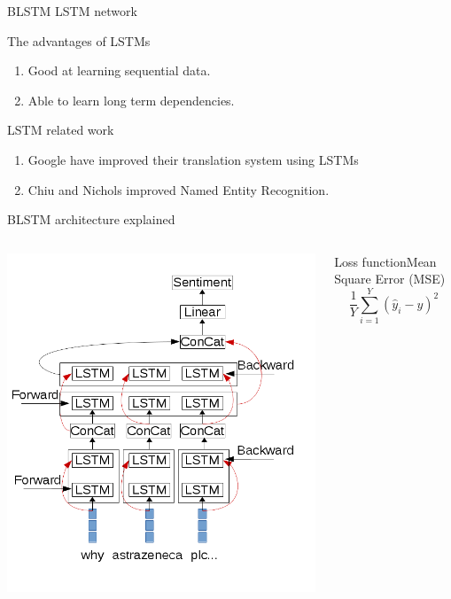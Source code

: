 \documentclass[10pt]{beamer}
\begin{document}
\begin{frame}[fragile]{BLSTM LSTM network}
\begin{block}{The advantages of LSTMs}
\begin{enumerate}
\item Good at learning sequential data.
\item Able to learn long term dependencies.
\end{enumerate}

\end{block}
\begin{block}{LSTM related work}
\begin{enumerate}
\item Google have improved their translation system using LSTMs\cite{wu2016google}
\item  Chiu and Nichols improved Named Entity Recognition\cite{chiu2015named}.
\end{enumerate}

\end{block}

\end{frame}

\begin{frame}[fragile]{BLSTM architecture explained}
\begin{columns}[T,onlytextwidth]
\includegraphics[scale=0.3]{lstm_diagram.png}

\centering
\begin{block}{Loss function\newline Mean Square Error (MSE)}
\begin{equation}
\frac{1}{Y}\sum\limits_{i=1}^{Y} (\hat y_i - y)^2
\end{equation}

\end{block}
\end{columns}
\end{frame}
\end{document}
